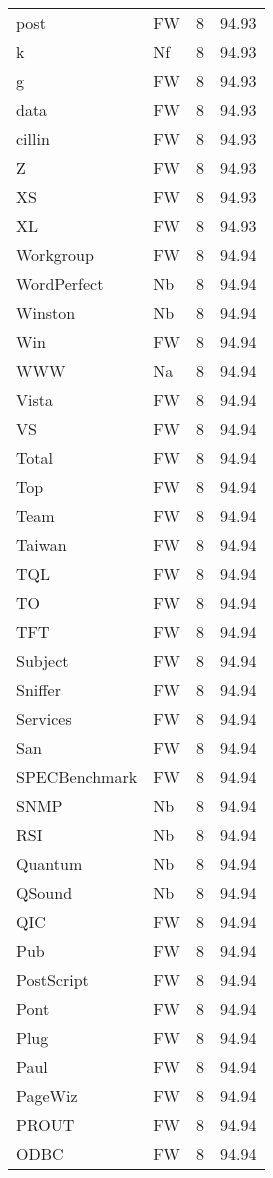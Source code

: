 \documentclass[twocolumn]{book}
\begin{document}
\begin{supertabular}{llrr}
post & FW & 8 &  94.93\\
k & Nf & 8 &  94.93\\
g & FW & 8 &  94.93\\
data & FW & 8 &  94.93\\
cillin & FW & 8 &  94.93\\
Z & FW & 8 &  94.93\\
XS & FW & 8 &  94.93\\
XL & FW & 8 &  94.93\\
Workgroup & FW & 8 &  94.94\\
WordPerfect & Nb & 8 &  94.94\\
Winston & Nb & 8 &  94.94\\
Win & FW & 8 &  94.94\\
WWW & Na & 8 &  94.94\\
Vista & FW & 8 &  94.94\\
VS & FW & 8 &  94.94\\
Total & FW & 8 &  94.94\\
Top & FW & 8 &  94.94\\
Team & FW & 8 &  94.94\\
Taiwan & FW & 8 &  94.94\\
TQL & FW & 8 &  94.94\\
TO & FW & 8 &  94.94\\
TFT & FW & 8 &  94.94\\
Subject & FW & 8 &  94.94\\
Sniffer & FW & 8 &  94.94\\
Services & FW & 8 &  94.94\\
San & FW & 8 &  94.94\\
SPECBenchmark & FW & 8 &  94.94\\
SNMP & Nb & 8 &  94.94\\
RSI & Nb & 8 &  94.94\\
Quantum & Nb & 8 &  94.94\\
QSound & Nb & 8 &  94.94\\
QIC & FW & 8 &  94.94\\
Pub & FW & 8 &  94.94\\
PostScript & FW & 8 &  94.94\\
Pont & FW & 8 &  94.94\\
Plug & FW & 8 &  94.94\\
Paul & FW & 8 &  94.94\\
PageWiz & FW & 8 &  94.94\\
PROUT & FW & 8 &  94.94\\
ODBC & FW & 8 &  94.94\\

\end{supertabular}
\end{document}
